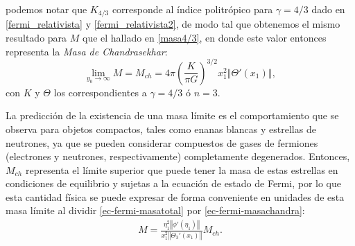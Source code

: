 podemos notar que $K_{4/3}$ corresponde al índice politrópico para $\gamma=4/3$ dado en \eqref{fermi_relativista} y \eqref{fermi_relativista2}, de modo tal que obtenemos el mismo resultado para $M$ que el hallado en \eqref{masa4/3}, en donde este valor entonces representa la \emph{Masa de Chandrasekhar}:
\begin{equation}\label{masachandra2}
\boxed{\lim_{y_0\to\infty}M=M_{ch}=4\pi\left(\frac{K}{\pi G}\right)^{3/2}x_1^2\left\Vert\Theta'(x_1)\right\Vert},
\end{equation}
con $K$ y $\Theta$ los correspondientes a $\gamma=4/3$ ó $n=3$.

La predicción de la existencia de una masa límite es el comportamiento que se observa para objetos compactos, tales como enanas blancas y estrellas de neutrones, ya que se pueden considerar compuestos de gases de fermiones (electrones y neutrones, respectivamente) completamente degenerados. Entonces, $M_{ch}$ representa el límite superior que puede tener la masa de estas estrellas en condiciones de equilibrio y sujetas a la ecuación de estado de Fermi, por lo que esta cantidad física se puede expresar de forma conveniente en unidades de esta masa límite al dividir \eqref{ec-fermi-masatotal} por \eqref{ec-fermi-masachandra}:
\begin{align}\label{ec-fermi-masa-masachandra}
 \boxed{M=\frac{\eta_1^2\left\Vert\phi'(\eta_1)\right\Vert}{x_1^2\left\Vert\Theta_3'(x_1)\right\Vert}M_{ch}.}
\end{align}

